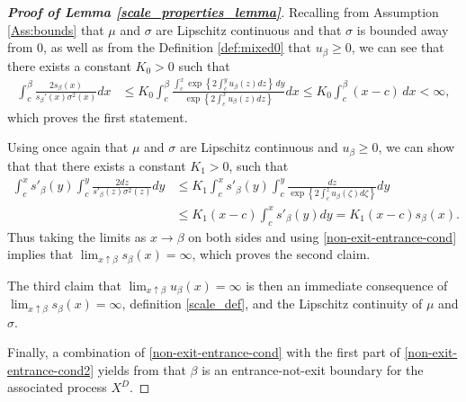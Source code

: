 \documentclass[11pt]{article} %
\numberwithin{komcounter}{section}
\begin{document}
\begin{proof}[\bf Proof of Lemma \ref{scale_properties_lemma}]
Recalling from Assumption \ref{Ass:bounds} that $\mu$ and $\sigma$ are Lipschitz continuous and that $\sigma$ is bounded away from $0$, as well as from the Definition \ref{def:mixed0} that $u_\beta \geq 0$, 
we can see that there exists a constant $K_0>0$ such that
\begin{align*}
    \int_c^{\beta}\frac{2s_\beta(x)}{s_\beta'(x)\sigma^2(x)}dx&\leq K_0\int_c^\beta\frac{\int_c^x\exp \left\{ 2\int_{c}^{y}u_\beta(z) dz \right\} \, dy}{\exp \left\{ 2\int_{c}^{x}u_\beta(z) dz \right\}}dx %
    \leq K_0 \int_c^\beta(x-c)\,dx<\infty ,
\end{align*}
which proves the first statement. 

Using once again that $\mu$ and $\sigma$ are Lipschitz continuous and $u_\beta \geq 0$, we can show that that there exists a constant $K_1>0$, such that
\begin{align*}
\int_c^x s'_\beta(y)\int_c^y \frac{2dz}{s'_\beta(z)\sigma^2(z)} dy 
&\leq K_1 \int_c^x s'_{\beta}(y)\int_{c}^{y}\frac{dz}{\exp \left\{ 2\int_{c}^{z}u_\beta(\zeta) d\zeta \right\}}dy\\
&\leq K_1 (x-c) \int_c^x s'_{\beta}(y)dy 
= K_1 (x-c) s_{\beta}(x).
\end{align*}
Thus taking the limits as $x \to \beta$ on both sides and using \eqref{non-exit-entrance-cond} implies that $\lim_{x\uparrow\beta}s_{\beta}(x)=\infty$, which proves the second claim. 

The third claim that $\lim_{x\uparrow \beta} u_\beta(x) = \infty$ is then an immediate consequence of $\lim_{x\uparrow\beta}s_{\beta}(x)=\infty$, definition \eqref{scale_def}, and the Lipschitz continuity of $\mu$ and $\sigma$. 

Finally, a combination of \eqref{non-exit-entrance-cond} with the first part of \eqref{non-exit-entrance-cond2} yields from \cite[Section II.1.6]{borodin2012handbook} that $\beta$ is an entrance-not-exit boundary for the associated process $X^D$. 
\end{proof}
\end{document}

